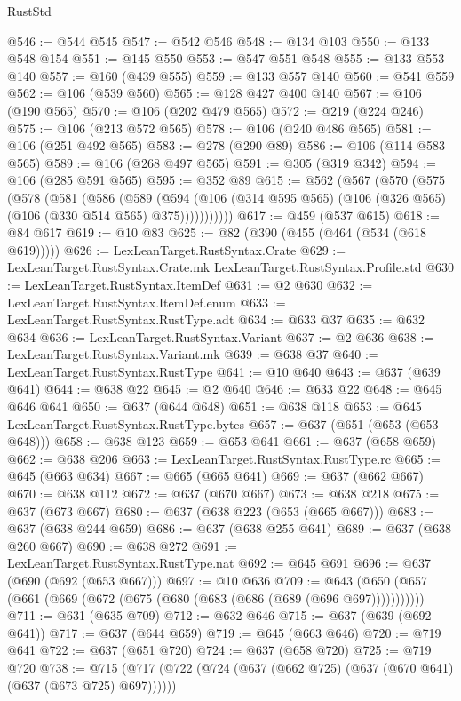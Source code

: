 \begin{lexlean}{RustStd}
\begin{coremodule}
@546 := @544 @545
@547 := @542 @546
@548 := @134 @103
@550 := @133 @548 @154
@551 := @145 @550
@553 := @547 @551 @548
@555 := @133 @553 @140
@557 := @160 (@439 @555)
@559 := @133 @557 @140
@560 := @541 @559
@562 := @106 (@539 @560)
@565 := @128 @427 @400 @140
@567 := @106 (@190 @565)
@570 := @106 (@202 @479 @565)
@572 := @219 (@224 @246)
@575 := @106 (@213 @572 @565)
@578 := @106 (@240 @486 @565)
@581 := @106 (@251 @492 @565)
@583 := @278 (@290 @89)
@586 := @106 (@114 @583 @565)
@589 := @106 (@268 @497 @565)
@591 := @305 (@319 @342)
@594 := @106 (@285 @591 @565)
@595 := @352 @89
@615 := @562
    (@567
      (@570
        (@575
          (@578
            (@581
              (@586
                (@589
                  (@594
                    (@106 (@314 @595 @565) (@106 (@326 @565) (@106 (@330 @514 @565) @375)))))))))))
@617 := @459 (@537 @615)
@618 := @84 @617
@619 := @10 @83
@625 := @82 (@390 (@455 (@464 (@534 (@618 @619)))))
@626 := LexLeanTarget.RustSyntax.Crate
@629 := LexLeanTarget.RustSyntax.Crate.mk LexLeanTarget.RustSyntax.Profile.std
@630 := LexLeanTarget.RustSyntax.ItemDef
@631 := @2 @630
@632 := LexLeanTarget.RustSyntax.ItemDef.enum
@633 := LexLeanTarget.RustSyntax.RustType.adt
@634 := @633 @37
@635 := @632 @634
@636 := LexLeanTarget.RustSyntax.Variant
@637 := @2 @636
@638 := LexLeanTarget.RustSyntax.Variant.mk
@639 := @638 @37
@640 := LexLeanTarget.RustSyntax.RustType
@641 := @10 @640
@643 := @637 (@639 @641)
@644 := @638 @22
@645 := @2 @640
@646 := @633 @22
@648 := @645 @646 @641
@650 := @637 (@644 @648)
@651 := @638 @118
@653 := @645 LexLeanTarget.RustSyntax.RustType.bytes
@657 := @637 (@651 (@653 (@653 @648)))
@658 := @638 @123
@659 := @653 @641
@661 := @637 (@658 @659)
@662 := @638 @206
@663 := LexLeanTarget.RustSyntax.RustType.rc
@665 := @645 (@663 @634)
@667 := @665 (@665 @641)
@669 := @637 (@662 @667)
@670 := @638 @112
@672 := @637 (@670 @667)
@673 := @638 @218
@675 := @637 (@673 @667)
@680 := @637 (@638 @223 (@653 (@665 @667)))
@683 := @637 (@638 @244 @659)
@686 := @637 (@638 @255 @641)
@689 := @637 (@638 @260 @667)
@690 := @638 @272
@691 := LexLeanTarget.RustSyntax.RustType.nat
@692 := @645 @691
@696 := @637 (@690 (@692 (@653 @667)))
@697 := @10 @636
@709 := @643 (@650 (@657 (@661 (@669 (@672 (@675 (@680 (@683 (@686 (@689 (@696 @697)))))))))))
@711 := @631 (@635 @709)
@712 := @632 @646
@715 := @637 (@639 (@692 @641))
@717 := @637 (@644 @659)
@719 := @645 (@663 @646)
@720 := @719 @641
@722 := @637 (@651 @720)
@724 := @637 (@658 @720)
@725 := @719 @720
@738 := @715 (@717 (@722 (@724 (@637 (@662 @725) (@637 (@670 @641) (@637 (@673 @725) @697))))))

\end{coremodule}
\end{lexlean}

